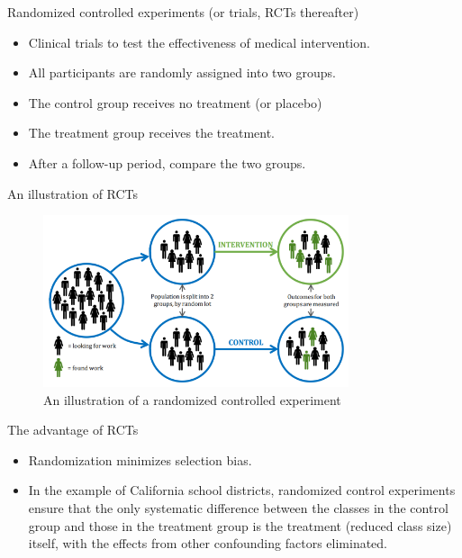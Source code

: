 \documentclass[presentation]{beamer}
\begin{document}
\begin{frame}[label={sec:org66c68dd}]{Randomized controlled experiments (or trials, RCTs thereafter)}
\begin{itemize}
\item Clinical trials to test the effectiveness of medical
intervention.
\item All participants are \alert{randomly} assigned into two groups.
\item The control group receives no treatment (or placebo)
\item The treatment group receives the treatment.
\item After a follow-up period, compare the two groups.
\end{itemize}
\end{frame}

\begin{frame}[label={sec:orgdca644e}]{An illustration of RCTs}
\begin{figure}[htbp]
\centering
\includegraphics[width=0.8\textwidth,height=0.6\textheight]{figure/rct_example.png}
\caption{\label{fig:orgd14f26e}
An illustration of a randomized controlled experiment}
\end{figure}
\end{frame}

\begin{frame}[label={sec:org557de8d}]{The advantage of RCTs}
\begin{itemize}
\item Randomization minimizes selection bias.
\item In the example of California school districts,
randomized control experiments ensure that the only systematic difference
between the classes in the control group and those in the treatment
group is the treatment (reduced class size) itself, with the effects
from other \alert{confounding factors} eliminated.
\end{itemize}
\end{frame}
\end{document}
